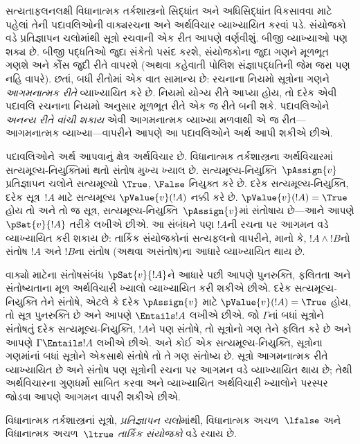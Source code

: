 સત્યતાફલનલક્ષી વિધાનાત્મક તર્કશાસ્ત્રનો સિદ્ધાંત અને અધિસિદ્ધાંત
વિકસાવવા માટે પહેલાં તેની પદાવલિઓની વાક્યરચના અને અર્થવિચાર વ્યાખ્યાયિત
કરવાં પડે. સંયોજકો વડે પ્રતિજ્ઞાપન ચલોમાંથી
સૂત્રો રચવાની એક રીત આપણે વર્ણવીશું. બીજી વ્યાખ્યાઓ પણ શક્ય
છે. બીજી પદ્ધતિઓ જુદા સંકેતો પસંદ કરશે, સંયોજકોના જુદા ગણને મૂળભૂત
ગણશે અને કૌંસ જુદી રીતે વાપરશે (અથવા કહેવાતી પોલિશ સંજ્ઞાપદ્ધતિની
જેમ જરા પણ નહિ વાપરે). છતાં, બધી રીતોમાં એક વાત સામાન્ય છે: રચનાના
નિયમો સૂત્રોના ગણને \emph{આગમનાત્મક રીતે} વ્યાખ્યાયિત કરે છે.
નિયમો યોગ્ય રીતે આપ્યા હોય, તો દરેક એવી પદાવલિ રચનાના નિયમો અનુસાર મૂળભૂત રીતે
એક જ રીતે બની શકે. પદાવલિઓને \emph{અનન્ય રીતે વાંચી શકાય} એવી આગમનાત્મક
વ્યાખ્યા મળવાથી એ જ રીત---આગમનાત્મક વ્યાખ્યા---વાપરીને આપણે આ
પદાવલિઓને અર્થ આપી શકીએ છીએ.

પદાવલિઓને અર્થ આપવાનું ક્ષેત્ર અર્થવિચાર છે. વિધાનાત્મક તર્કશાસ્ત્રના
અર્થવિચારમાં સત્યમૂલ્ય-નિયુક્તિમાં થતો સંતોષ મુખ્ય ખ્યાલ છે.
સત્યમૂલ્ય-નિયુક્તિ~$\pAssign{v}$ પ્રતિજ્ઞાપન ચલોને સત્યમૂલ્યો
$\True$, $\False$ નિયુક્ત કરે છે. દરેક સત્યમૂલ્ય-નિયુક્તિ, દરેક
સૂત્ર~$!A$ માટે સત્યમૂલ્ય $\pValue{v}(!A)$ નક્કી કરે છે.
$\pValue{v}(!A)=\True$ હોય તો અને તો જ સૂત્ર,
સત્યમૂલ્ય-નિયુક્તિ~$\pAssign{v}$માં સંતોષાય છે---આને આપણે
$\pSat{v}{!A}$ તરીકે લખીએ છીએ. આ સંબંધને પણ $!A$ની રચના પર આગમન
વડે વ્યાખ્યાયિત કરી શકાય છે: તાર્કિક સંયોજકોનાં સત્યફલનો વાપરીને,
માનો કે, $!A\land !B$નો સંતોષ $!A$ અને $!B$ના સંતોષ (અથવા
અસંતોષ)ના આધારે વ્યાખ્યાયિત થાય છે.

વાક્યો માટેના સંતોષસંબંધ $\pSat{v}{!A}$ને આધારે પછી આપણે પુનરુક્તિ,
ફલિતતા અને સંતોષ્યતાના મૂળ અર્થવિચારી ખ્યાલો વ્યાખ્યાયિત કરી શકીએ
છીએ. દરેક સત્યમૂલ્ય-નિયુક્તિ તેને સંતોષે, એટલે કે દરેક $\pAssign{v}$ માટે
$\pValue{v}(!A)=\True$ હોય, તો સૂત્ર પુનરુક્તિ છે અને આપણે
$\Entails !A$ લખીએ છીએ. જો $\Gamma$નાં બધાં સૂત્રોને સંતોષતું
દરેક સત્યમૂલ્ય-નિયુક્તિ, $!A$ને પણ સંતોષે, તો સૂત્રોનો ગણ તેને
ફલિત કરે છે અને આપણે $\Gamma\Entails !A$ લખીએ છીએ. અને કોઈ એક
સત્યમૂલ્ય-નિયુક્તિ, સૂત્રોના ગણમાંનાં બધાં સૂત્રોને એકસાથે સંતોષે તો
તે ગણ સંતોષ્ય છે. સૂત્રો આગમનાત્મક રીતે વ્યાખ્યાયિત છે અને
સંતોષ પણ સૂત્રોની રચના પર આગમન વડે વ્યાખ્યાયિત થાય છે; તેથી
અર્થવિચારના ગુણધર્મો સાબિત કરવા અને વ્યાખ્યાયિત અર્થવિચારી ખ્યાલોને
પરસ્પર જોડવા આપણે આગમન વાપરી શકીએ છીએ.
\endgroup


\begingroup
\makeatletter{}\makeatother


\label{guunit:OLP-0058}


વિધાનાત્મક તર્કશાસ્ત્રનાં સૂત્રો,
\emph{પ્રતિજ્ઞાપન ચલો}માંથી,
  વિધાનાત્મક અચળ~$\lfalse$
    અને વિધાનાત્મક અચળ~$\ltrue$ \emph{તાર્કિક સંયોજકો} વડે
રચાય છે.


